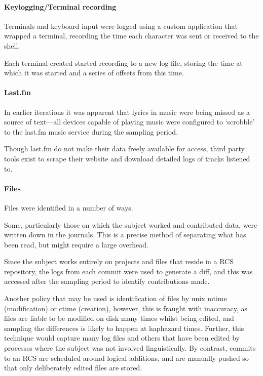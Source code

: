 \paragraph{Keylogging/Terminal recording}
Terminals and keyboard input were logged using a custom application that wrapped a terminal, recording the time each character was sent or received to the shell.

Each terminal created started recording to a new log file, storing the time at which it was started and a series of offsets from this time.

\paragraph{Last.fm}
In earlier iterations it was apparent that lyrics in music were being missed as a source of text---all devices capable of playing music were configured to `scrobble' to the last.fm music service during the sampling period.

Though last.fm do not make their data freely available for access, third party tools exist to scrape their website and download detailed logs of tracks listened to.

\paragraph{Files}
Files were identified in a number of ways.

Some, particularly those on which the subject worked and contributed data, were written down in the journals.  This is a precise method of separating what has been read, but might require a large overhead.

Since the subject works entirely on projects and files that reside in a RCS repository, the logs from each commit were used to generate a diff, and this was accessed after the sampling period to identify contributions made.

Another policy that may be used is identification of files by unix mtime (modification) or ctime (creation), however, this is fraught with inaccuracy, as files are liable to be modified on disk many times whilst being edited, and sampling the differences is likely to happen at haphazard times.  Further, this technique would capture many log files and others that have been edited by processes where the subject was not involved linguistically.  By contrast, commits to an RCS are scheduled around logical additions, and are manually pushed so that only deliberately edited files are stored.

